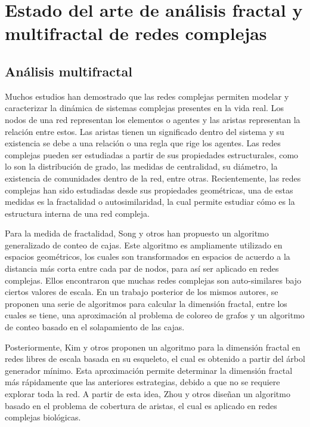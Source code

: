 \section{Estado del arte de análisis fractal y multifractal de redes complejas}

\subsection{Análisis multifractal}

Muchos estudios han demostrado que las redes complejas permiten modelar y caracterizar la dinámica de sistemas complejas presentes en la vida real\cite{BarabasiNetwork}. Los nodos de una red representan los elementos o agentes y las aristas representan la relación entre estos. Las aristas tienen un significado dentro del sistema y su existencia se debe a una relación o una regla que rige los agentes. Las redes complejas pueden ser estudiadas a partir de sus propiedades estructurales, como lo son la distribución de grado, las medidas de centralidad, su diámetro, la existencia de comunidades dentro de la red, entre otras. Recientemente, las redes complejas han sido estudiadas desde sus propiedades geométricas, una de estas medidas es la fractalidad o autosimilaridad, la cual permite estudiar cómo es la estructura interna de una red compleja\cite{Estrada2011}.

Para la medida de fractalidad, Song y otros\cite{Song2005} han propuesto un algoritmo generalizado de conteo de cajas. Este algoritmo es ampliamente utilizado en espacios geométricos, los cuales son transformados en espacios de acuerdo a la distancia más corta entre cada par de nodos, para así ser aplicado en redes complejas. Ellos encontraron que muchas redes complejas son auto-similares bajo ciertos valores de escala. En un trabajo posterior de los mismos autores\cite{Song2007}, se proponen una serie de algoritmos para calcular la dimensión fractal, entre los cuales se tiene, una aproximación al problema de coloreo de grafos y un algoritmo de conteo basado en el solapamiento de las cajas.

Posteriormente, Kim y otros\cite{Kim2007A}\cite{Kim2007B} proponen un algoritmo para la dimensión fractal en redes libres de escala basada en su esqueleto, el cual es obtenido a partir del árbol generador mínimo. Esta aproximación permite determinar la dimensión fractal más rápidamente que las anteriores estrategias, debido a que no se requiere explorar toda la red. A partir de esta idea, Zhou y otros\cite{Zhou2007} diseñan un algoritmo basado en el problema de cobertura de aristas, el cual es aplicado en redes complejas biológicas. 

